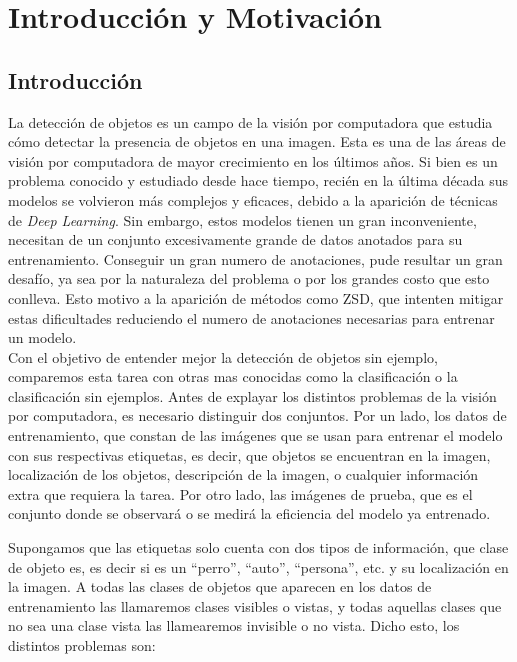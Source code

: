 \chapter{Introducción y Motivación} \label{cap:intro}

\section{Introducción} \label{sec:introduccion}
La detección de objetos es un campo de la visión por computadora que estudia cómo detectar la presencia de objetos en una imagen. Esta es una de las áreas de visión por computadora de mayor crecimiento en los últimos años. Si bien es un problema conocido y estudiado desde hace tiempo, recién en la última década sus modelos se volvieron más complejos y eficaces, debido a la aparición de técnicas  de \textit{Deep Learning}. Sin embargo, estos modelos tienen un gran inconveniente, necesitan de un conjunto excesivamente grande de datos anotados para su entrenamiento. Conseguir un gran numero de anotaciones, pude resultar un gran desafío, ya sea por la naturaleza del problema o por los grandes costo que esto conlleva. Esto motivo a la aparición de métodos como ZSD, que intenten mitigar estas dificultades reduciendo el numero de anotaciones necesarias para entrenar un modelo.\\

Con el objetivo de entender mejor la detección de objetos sin ejemplo, comparemos esta tarea con otras mas conocidas como la clasificación o la clasificación sin ejemplos. Antes de explayar los distintos problemas de la visión por computadora, es necesario distinguir dos conjuntos. Por un lado, los datos de entrenamiento, que constan de las imágenes que se usan para entrenar el modelo con sus respectivas etiquetas, es decir, que objetos se encuentran en la imagen, localización de los objetos, descripción de la imagen, o cualquier información extra que requiera la tarea. Por otro lado, las imágenes de prueba, que es el conjunto donde se observará o se medirá la eficiencia del modelo ya entrenado. 

Supongamos que las etiquetas solo cuenta con dos tipos de información, que clase de objeto es, es decir si es un ``perro'', ``auto'', ``persona'', etc. y su localización en la imagen. A todas las clases de objetos que aparecen en los datos de entrenamiento las llamaremos clases visibles o vistas, y todas aquellas clases que no sea una clase vista las llamearemos invisible o no vista. Dicho esto, los distintos problemas son:

